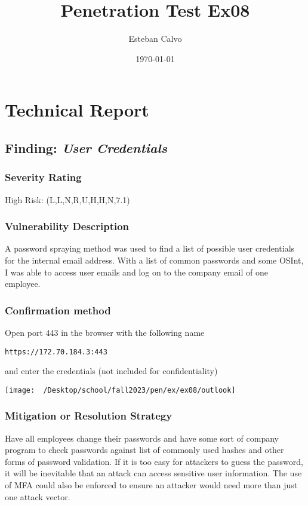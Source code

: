 \documentclass[notitlepage]{article}
\begin{document}
  
\title{Penetration Test Ex08}
\author{Esteban Calvo}
\date{\isodate\today}

\maketitle

\tableofcontents

\newpage

\section{Technical Report}

  \subsection{Finding: \emph{User Credentials}}
  
	\subsubsection*{Severity Rating}
	    High Risk:	    
		\cvss(L,L,N,R,U,H,H,N,7.1)
		
  	\subsubsection*{Vulnerability Description}
  		A password spraying method was used to find a list of possible user credentials for the internal email address. With a list of
        common passwords and some OSInt, I was able to access user emails and log on to the company email of one employee.

  	\subsubsection*{Confirmation method}
  	    Open port 443 in the browser with the following name
\begin{verbatim}
https://172.70.184.3:443
\end{verbatim}

    and enter the credentials (not included for confidentiality)

\texttt{[image: ~/Desktop/school/fall2023/pen/ex/ex08/outlook]}
				
    \subsubsection*{Mitigation or Resolution Strategy}
        Have all employees change their passwords and have some sort of company program to check passwords against list of commonly used hashes and other forms of password validation.
        If it is too easy for attackers to guess the password, it will be inevitable that an attack can access sensitive user information. The use of MFA could also be enforced
        to ensure an attacker would need more than just one attack vector.
\end{document}
